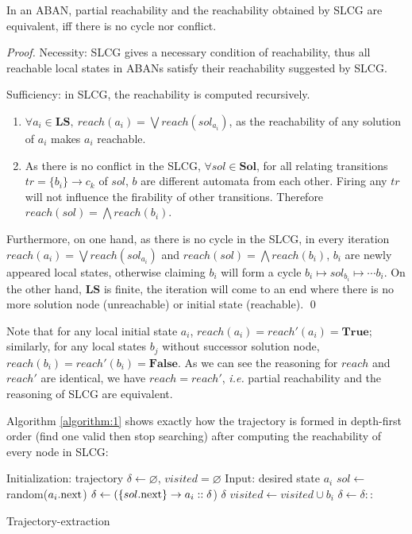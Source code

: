 \documentclass[runningheads]{llncs}
\newcommand{\acm}[3]{\{#1\}\rightarrow#3}
\begin{document}
\begin{theorem}
In an ABAN, partial reachability and the reachability obtained by SLCG are equivalent, iff there is no cycle nor conflict.
\end{theorem}
\begin{proof}
Necessity: SLCG gives a necessary condition of reachability, thus all reachable local states in ABANs satisfy their reachability suggested by SLCG.

\noindent Sufficiency: in SLCG, the reachability is computed recursively.
\begin{enumerate}
\item $\forall a_i\in \mathbf{LS},\ reach(a_i)=\bigvee reach(sol_{a_i})$, as the reachability of any solution
of $a_i$ makes $a_i$ reachable.\label{1}
\item As there is no conflict in the SLCG, $\forall sol\in \mathbf{Sol}$, for all relating transitions $tr=\acm{b_i}{c_j}{c_k}$ of $sol$, $b$ are different automata from each other.
Firing any $tr$ will not influence the firability of other transitions. Therefore $reach(sol)=\bigwedge reach(b_i)$.
\end{enumerate}
Furthermore, on one hand, as there is no cycle in the SLCG, in every iteration $reach(a_i)=\bigvee reach(sol_{a_i})$ and $reach(sol)=\bigwedge reach(b_i)$, $b_i$ are newly appeared local states, otherwise claiming $b_i$ will form a cycle $b_i\mapsto sol_{b_i}\mapsto \cdots b_i$.
On the other hand, $\mathbf{LS}$ is finite, the iteration will come to an end where there is no more solution node (unreachable) or initial state (reachable).	
\qed\end{proof} 

Note that for any local initial state $a_i$, $reach(a_i)=reach'(a_i)=\mathbf{True}$; similarly, for any local states $b_j$ without successor solution node, $reach(b_i)=reach'(b_i)=\mathbf{False}$.
As we can see the reasoning for $reach$ and $reach'$ are identical, we have $reach=reach'$, \textit{i.e.} partial reachability and the reasoning of SLCG are equivalent.

Algorithm \ref{algorithm:1} shows exactly how the trajectory is formed in depth-first order (find one valid then stop searching) after computing the reachability of every node in SLCG:

\begin{algorithm}[ht]
\begin{algorithmic}
\State Initialization: trajectory $\delta\gets\varnothing$, $visited=\varnothing$
\State Input: desired state $a_i$
	\State $sol\gets $random($a_i{\rm .next}$)%
	\State $\delta \gets (\acm{sol{\rm .next}}{a_{\lnot i}}{a_i}::\delta$)
    	\State \Return $\delta$
    \EndIf
        	\State$visited\gets visited\cup b_i$
            \State $\delta\gets \delta::$
        \EndFor
    \EndIf
\EndFunction
\end{algorithmic}
\caption{Trajectory-extraction}
\label{algorithm:1}
\end{algorithm}
\end{document}
